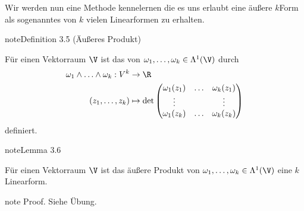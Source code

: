 \documentclass[letterpaper,10pt,english]{jupyterBook}
\begin{document}
\sphinxAtStartPar
Wir werden nun eine Methode kennelernen die es uns erlaubt eine äußere \(k\)\sphinxhyphen{}Form als sogenanntes  von \(k\) vielen Linearformen zu erhalten.
\label{vektoranalysis/multilinear:definition-16}
\begin{sphinxadmonition}{note}{Definition 3.5 (Äußeres Produkt)}



\sphinxAtStartPar
Für einen Vektorraum \(\V\) ist das  von \(\omega_1,\ldots,\omega_k\in\Lambda^1(\V)\)
durch
\begin{equation*}
\begin{split}\omega_1\wedge\ldots\wedge\omega_k:V^k&\to\R\\
(z_1,\ldots,z_k)&\mapsto 
\det
\begin{pmatrix}
\omega_1(z_1)&\ldots&\omega_k(z_1)\\ 
\vdots&&\vdots\\
\omega_1(z_k)&\ldots&\omega_k(z_k)
\end{pmatrix}\end{split}
\end{equation*}
\sphinxAtStartPar
definiert.
\end{sphinxadmonition}
\label{vektoranalysis/multilinear:lemma-17}
\begin{sphinxadmonition}{note}{Lemma 3.6}



\sphinxAtStartPar
Für einen Vektorraum \(\V\) ist das äußere Produkt von \(\omega_1,\ldots,\omega_k\in\Lambda^1(\V)\) eine \(k\)\sphinxhyphen{}Linearform.
\end{sphinxadmonition}

\begin{sphinxadmonition}{note}
\sphinxAtStartPar
Proof. Siehe Übung.
\end{sphinxadmonition}
\end{document}

